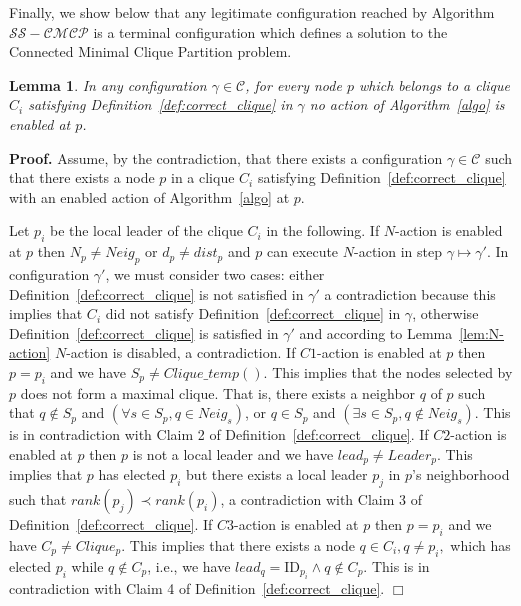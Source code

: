 \documentclass[11pt,letterpaper,onecolumn]{article}
\newtheorem{lemma}{Lemma}
\newenvironment{proof}{\noindent \begin{rm}{\textbf{Proof.} }}{\hspace*{\fill}$\Box$\par\end{rm} \vspace{.3cm}}
\newcommand{\id}{\mbox{ID}}
\begin{document}
Finally, we show below that any legitimate configuration reached by Algorithm $\mathcal{SS-CMCP}$ is a terminal configuration which defines a solution to the Connected Minimal Clique Partition problem.

\begin{lemma}
\label{lem:no_enable_action}
In any configuration $\gamma \in \mathcal{C}$, for every node $p$ which belongs to a clique $C_i$ satisfying Definition~\ref{def:correct_clique} in $\gamma$ no action of Algorithm~\ref{algo} is enabled at $p$.
\end{lemma}

\begin{proof}
Assume, by the contradiction, that there exists a configuration $\gamma \in \mathcal{C}$ such that there exists a node $p$ in a clique $C_i$ satisfying Definition~\ref{def:correct_clique} with an enabled action of Algorithm~\ref{algo} at $p$.

Let $p_i$ be the local leader of the clique $C_i$ in the following. If $N$-action is enabled at $p$ then $N_p \neq Neig_p$ or $d_p \neq dist_p$ and $p$ can execute $N$-action in step $\gamma \mapsto \gamma'$. In configuration $\gamma'$, we must consider two cases: either Definition~\ref{def:correct_clique} is not satisfied in $\gamma'$ a contradiction because this implies that $C_i$ did not satisfy Definition~\ref{def:correct_clique} in $\gamma$, otherwise Definition~\ref{def:correct_clique} is satisfied in $\gamma'$ and according to Lemma~\ref{lem:N-action} $N$-action is disabled, a contradiction.
If $C1$-action is enabled at $p$ then $p=p_i$ and we have $S_p \neq Clique\_temp()$. This implies that the nodes selected by $p$ does not form a maximal clique. That is, there exists a neighbor $q$ of $p$ such that $q \not \in S_p$ and $(\forall s \in S_p, q \in Neig_s)$, or $q \in S_p$ and $(\exists s \in S_p, q \not \in Neig_s)$. This is in contradiction with Claim 2 of Definition~\ref{def:correct_clique}.
If $C2$-action is enabled at $p$ then $p$ is not a local leader and we have $lead_p \neq Leader_p$. This implies that $p$ has elected $p_i$ but there exists a local leader $p_j$ in $p$'s neighborhood such that $rank(p_j) \prec rank(p_i)$, a contradiction with Claim 3 of Definition~\ref{def:correct_clique}.
If $C3$-action is enabled at $p$ then $p=p_i$ and we have $C_p \neq Clique_p$. This implies that there exists a node $q \in C_i, q \neq p_i,$ which has elected $p_i$ while $q \not \in C_p$, i.e., we have $lead_q=\id_{p_i} \wedge q \not \in C_p$. This is in contradiction with Claim 4 of Definition~\ref{def:correct_clique}.
\end{proof}
\end{document}
